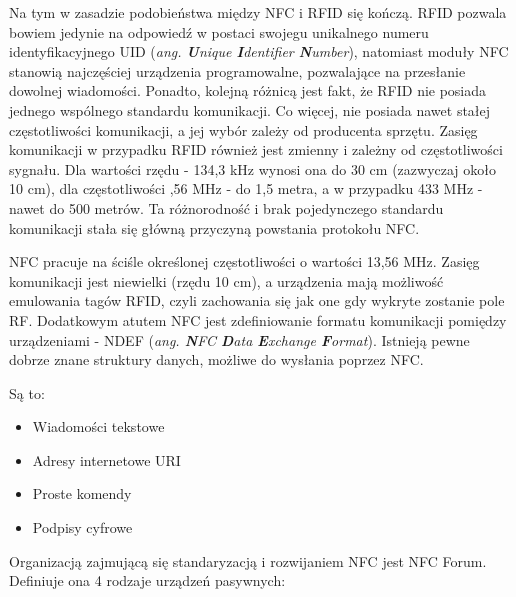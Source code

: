 Na tym w zasadzie podobieństwa między NFC i RFID się kończą. RFID pozwala bowiem jedynie na odpowiedź w postaci swojegu unikalnego numeru identyfikacyjnego UID (\textit{ang. \textbf{U}nique \textbf{I}dentifier \textbf{N}umber}), natomiast moduły NFC stanowią najczęściej urządzenia programowalne, pozwalające na przesłanie dowolnej wiadomości. Ponadto, kolejną różnicą jest fakt, że RFID nie posiada jednego wspólnego standardu komunikacji. Co więcej, nie posiada nawet stałej częstotliwości komunikacji, a jej wybór zależy od producenta sprzętu. Zasięg komunikacji w przypadku RFID również jest zmienny i zależny od częstotliwości sygnału. Dla wartości rzędu  - 134,3 kHz wynosi ona do 30 cm (zazwyczaj około 10 cm), dla częstotliwości ,56 MHz - do 1,5 metra, a w przypadku 433 MHz - nawet do 500 metrów. Ta różnorodność i brak pojedynczego standardu komunikacji stała się główną przyczyną powstania protokołu NFC.

NFC pracuje na ściśle określonej częstotliwości o wartości 13,56 MHz. Zasięg komunikacji jest niewielki (rzędu 10 cm), a urządzenia mają możliwość emulowania tagów RFID, czyli zachowania się jak one gdy wykryte zostanie pole RF. Dodatkowym atutem NFC jest zdefiniowanie formatu komunikacji pomiędzy urządzeniami - NDEF (\textit{ang. \textbf{N}FC \textbf{D}ata \textbf{E}xchange \textbf{F}ormat}). Istnieją pewne dobrze znane struktury danych, możliwe do wysłania poprzez NFC.

 Są to:

\begin{itemize}
\item Wiadomości tekstowe
\item Adresy internetowe URI
\item Proste komendy
\item Podpisy cyfrowe
\end{itemize}

Organizacją zajmującą się standaryzacją i rozwijaniem NFC jest NFC Forum. Definiuje ona 4 rodzaje urządzeń pasywnych:

